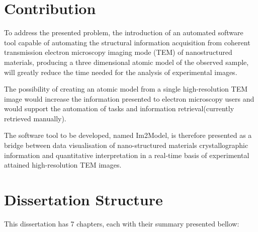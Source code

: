 \documentclass[
  oneside,
  11pt, a4paper,
  footinclude=true,
  headinclude=true,
  cleardoublepage=empty
]{scrbook}
\begin{document}
	\section{Contribution}
	
	To address the presented problem, the introduction of an automated software tool capable of automating the structural information acquisition from coherent transmission electron microscopy imaging mode (TEM) of nanostructured materials, producing a three dimensional atomic model of the observed sample, will greatly reduce the time needed for the analysis of experimental images.\par 
	
	The possibility of creating an atomic model from a single high-resolution TEM image would increase the information presented to electron microscopy users and would support the automation of tasks and information retrieval(currently retrieved manually).\par 
	
	The software tool to be developed, named Im2Model, is therefore presented as a bridge between data visualisation of nano-structured materials crystallographic information and quantitative interpretation in a real-time basis of experimental attained high-resolution TEM images.
	



	\section{Dissertation Structure}
		

This dissertation has 7 chapters, each with their summary presented bellow:
\end{document}
